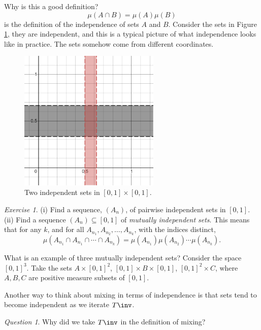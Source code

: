 \documentclass{article}
\theoremstyle{remark}
\newtheorem*{question}{Question}
\newtheorem{exercise}{Exercise}
\begin{document}
Why is this a good definition?
\[ \mu(A\cap B) = \mu(A)\mu(B) \]
is the definition of the independence of sets $A$ and $B$.
Consider the sets in Figure \ref{fig:independence},
they are independent, and this is a typical picture 
of what independence looks like in practice.
The sets somehow come from different coordinates.
\begin{figure}
    \centering
    \includegraphics[width=0.6\textwidth]{independence.png}
    \caption{Two independent sets in $[0,1]\times [0,1]$.}
    \label{fig:independence}
\end{figure}

\begin{exercise}
    (i) Find a sequence, $(A_n)$, of pairwise independent sets in 
    $[0,1]$.
    (ii) Find a sequence $(A_n)\subseteq [0,1]$ of 
    \emph{mutually independent sets}. This means that for
    any $k$, and for all $A_{n_1},A_{n_2},\ldots,A_{n_k}$,
    with the indices distinct,
    \[\mu(A_{n_1}\cap A_{n_1}\cap \cdots \cap A_{n_k})
    = \mu(A_{n_1})\mu(A_{n_2})\cdots \mu(A_{n_k}).
    \]
\end{exercise}

What is an example of three mutually independent sets?
Consider the space $[0,1]^3$. Take the sets $A\times [0,1]^2$,
$[0,1]\times B \times [0,1]$, $[0,1]^2\times C$,
where $A,B,C$ are positive measure subsets of $[0,1]$.

Another way to think about mixing in terms of independence
is that sets tend to become independent as we iterate $T\inv$.

\begin{question}
    Why did we take $T\inv$ in the definition of mixing?
\end{question}
\end{document}
